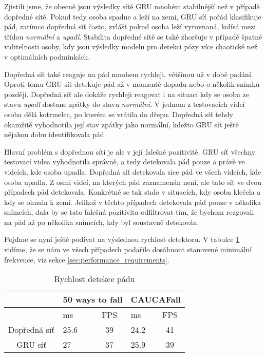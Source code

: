 Zjistili jsme, že obecně jsou výsledky sítě GRU mnohém stabilnější než v
případě dopředné sítě. Pokud tedy osoba spadne a leží na zemi, GRU síť pořád
klasifikuje pád, zatímco dopředná síť často, zvlášť pokud osoba leží vyrovnaná,
kolísá mezi třídou \textit{normální} a \textit{upadl}. Stabilita dopředné sítě
se také zhoršuje v případě špatné viditelnosti osoby, kdy jsou výsledky modelu
pro detekci pózy více chaotické než v optimálních podmínkách.

Dopředná síť také reaguje na pád mnohem rychleji, většinou už v době padání.
Oproti tomu GRU síť detekuje pád až v momentě dopadu nebo o několik snímků
později. Dopředná síť ale dokáže rychleji reagovat i na situaci kdy se osoba ze
stavu \textit{upadl} dostane zpátky do stavu \textit{normální}. V jednom z
testovacích videí osoba dělá kotrmelec, po kterém se vrátila do dřepu. Dopředná
síť tehdy okamžitě vyhodnotila její stav zpátky jako normální, kdežto GRU síť
ještě nějakou dobu identifikovala pád.

Hlavní problém s dopřednou síti je ale v její falešné pozitivitě. GRU síť
všechny testovací videa vyhodnotila správně, a tedy detekovala pád pouze a
právě ve videích, kde osoba upadla. Dopředná síť detekovala sice pád ve všech
videích, kde osoba upadla. Z osmi videí, na kterých pád zaznamenán není, ale
tato síť ve dvou případech pád detekovala. Konkrétně se tak stalo v situacích,
kdy osoba klečela a kdy se ohnula k zemi. Jelikož v těchto případech detekovala
pád pouze v několika snímcích, dala by se tato falešná pozitivita odfiltrovat
tím, že bychom reagovali na pád až po několika snímcích, kdy byl soustavně
detekován.

Pojďme se nyní ještě podívat na výslednou rychlost detektoru. V tabulce
\ref{tab:detectorSpeed} vidíme, že se nám ve všech případech podařilo dosáhnout
stanovené minimální frekvence, viz sekce \ref{sec:performance_requirements}.

\begin{table}[htbp]
    \centering
    \caption{Rychlost detekce pádu}
    \label{tab:detectorSpeed}
    \begin{tabular}{|c|cc|cc|}
        \hline
                     & \multicolumn{2}{l|}{50 ways to fall} & \multicolumn{2}{l|}{CAUCAFall}                                   \\ \hline
                     & \multicolumn{1}{l|}{ms}              & FPS                            & \multicolumn{1}{l|}{ms}   & FPS \\ \hline
        Dopředná síť & \multicolumn{1}{l|}{25.6}            & 39                             & \multicolumn{1}{l|}{24.2} & 41  \\ \hline
        GRU síť      & \multicolumn{1}{l|}{27}              & 37                             & \multicolumn{1}{l|}{25.9} & 39  \\ \hline
    \end{tabular}
\end{table}

